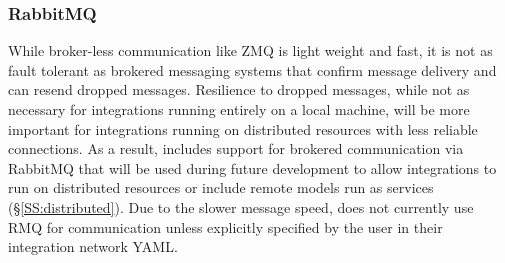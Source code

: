 \documentclass[journal]{IEEEtran}
\newcommand{\todo}[1]{{\color{red}{#1}}}
\newcommand{\pkg}{{\tt \todo{cis\_interface}}{}}
\begin{document}
\subsubsection{RabbitMQ}\label{SSS:rmq}
%
While broker-less communication like ZMQ is light weight and fast, it is not as fault 
tolerant as brokered messaging systems that confirm message delivery and can resend 
dropped messages. Resilience to dropped messages, while not as necessary for integrations 
running entirely on a local machine, will be more important for integrations running on 
distributed resources with less reliable connections. As a result, {\pkg} includes support 
for brokered communication via RabbitMQ \citep[RMQ][]{RMQ} that will be used during future 
development to allow integrations to run on distributed resources or include remote models 
run as services (\S\ref{SS:distributed}). Due to the slower message speed, 
{\pkg} does not currently use RMQ for communication unless explicitly specified by the user in their 
integration network YAML. 

\end{document}
